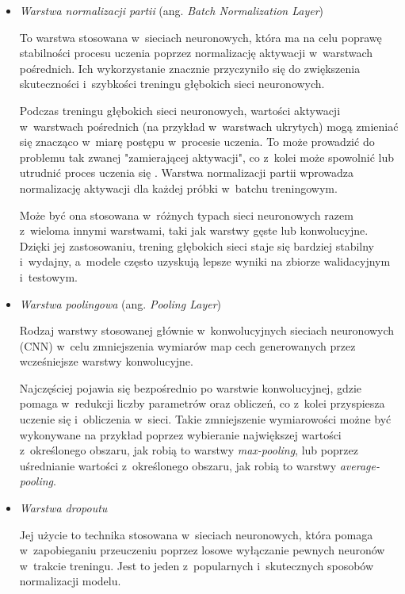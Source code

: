 \begin{itemize}
  \item \emph{Warstwa normalizacji partii} (ang. \emph{Batch Normalization Layer})

        To warstwa stosowana w~sieciach neuronowych, która ma na celu poprawę stabilności procesu uczenia poprzez normalizację aktywacji w~warstwach pośrednich.
        Ich wykorzystanie znacznie przyczyniło się do zwiększenia skuteczności i~szybkości treningu głębokich sieci neuronowych.

        Podczas treningu głębokich sieci neuronowych, wartości aktywacji w~warstwach pośrednich (na przykład w~warstwach ukrytych) mogą zmieniać się znacząco w~miarę postępu w~procesie uczenia.
        To może prowadzić do problemu tak zwanej "zamierającej aktywacji", co z~kolei może spowolnić lub utrudnić proces uczenia się \cite{bjorck2018understanding}.
        Warstwa normalizacji partii wprowadza normalizację aktywacji dla każdej próbki w~batchu treningowym.

        Może być ona stosowana w~różnych typach sieci neuronowych razem z~wieloma innymi warstwami, taki jak warstwy gęste lub konwolucyjne.
        Dzięki jej zastosowaniu, trening głębokich sieci staje się bardziej stabilny i~wydajny, a~modele często uzyskują lepsze wyniki na zbiorze walidacyjnym i~testowym.

  \item \emph{Warstwa poolingowa} (ang. \emph{Pooling Layer})

        Rodzaj warstwy stosowanej głównie w~konwolucyjnych sieciach neuronowych (CNN) w~celu zmniejszenia wymiarów map cech generowanych przez wcześniejsze warstwy konwolucyjne.

        Najczęściej pojawia się bezpośrednio po warstwie konwolucyjnej, gdzie pomaga w~redukcji liczby parametrów oraz obliczeń, co z~kolei przyspiesza uczenie się i~obliczenia w~sieci.
        Takie zmniejszenie wymiarowości możne być wykonywane na przykład poprzez wybieranie największej wartości z~określonego obszaru, jak robią to warstwy \emph{max-pooling}, lub poprzez uśrednianie wartości z~określonego obszaru, jak robią to warstwy \emph{average-pooling}.

  \item \emph{Warstwa dropoutu}

        Jej użycie to technika stosowana w~sieciach neuronowych, która pomaga w~zapobieganiu przeuczeniu poprzez losowe wyłączanie pewnych neuronów w~trakcie treningu.
        Jest to jeden z~popularnych i~skutecznych sposobów normalizacji modelu.


\end{itemize}

